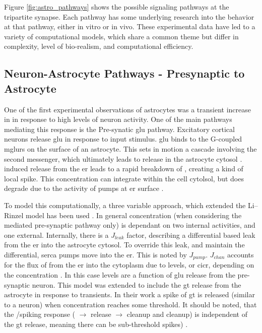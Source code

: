     Figure \ref{fig:astro_pathways} shows the possible signaling pathways at the
    tripartite synapse. Each pathway has some underlying research into the
    behavior at that pathway, either in vitro or in vivo. These experimental data
    have led to a variety of computational models, which share a common theme but
    differ in complexity, level of bio-realism, and computational efficiency.

    \subsection{Neuron-Astrocyte Pathways - Presynaptic to Astrocyte}

    One of the first experimental observations of astrocytes was a transient
    increase in \ca in response to high levels of neuron activity. One of the
    main pathways mediating this response is the Pre-synatic \gls{glu}
    pathway. Excitatory cortical neurons release \gls{glu} in response to input
    stimulus. \Gls{glu} binds to the G-coupled \glspl{mglur} on the surface
    of an astrocyte. This sets in motion a cascade involving the \ipt second
    messenger, which ultimately leads to \ca release in the astrocyte cytosol
    \parencite{pitta_2012}. \ipt induced \ca release from the \gls{er} leads to a rapid
    breakdown of \ipt, creating a kind of local \ca spike. This \ca
    concentration can integrate within the cell cytolsol, but does degrade due to
    the activity of pumps at \gls{er} surface \parencite{pitta_2012}.

    To model this computationally, a three variable approach, which extended the
    Li–Rinzel model \parencite{li_1994} has been used \parencite{pitta_2009}. In
    general \ca concentration (when considering the \ipt mediated pre-synaptic
    pathway only) is dependant on two internal activities, and one
    external. Internally, there is a $J_{leak}$ factor, describing a
    differential based leak from the \gls{er} into the astrocyte cytosol. To
    override this leak, and maintain the differential, \gls{serca} pumps move
    \ca into the \gls{er}. This is noted by $J_{pump}$. $J_{chan}$ accounts for
    the flux of \ca from the \gls{er} into the cytoplasm due to \ipt levels, or
    \gls{cicr}, depending on the \ca concentration \parencite{pitta_2009}. In
    this case \ipt levels are a function of \gls{glu} release from the
    pre-synaptic neuron. This model was extended to include the \gls{gt} release
    from the astrocyte in response to \ca transients. In their work a spike of
    \gls{gt} is released (similar to a neuron) when \ca concentration reaches
    some threshold. It should be noted, that the \ipt/\ca spiking response (\ipt
    $\rightarrow$ \ca release $\rightarrow$ \ipt cleanup and \ca cleanup) is
    independent of the \gls{gt} release, meaning there can be sub-threshold \ca
    spikes) \parencite{pitta_2016}.

